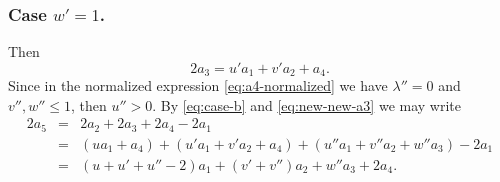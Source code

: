 \documentclass[12pt]{amsart}
\begin{document}
\subsubsection{Case \underline{$w'=1$}.} 
  Then
   \begin{equation}
			\label{eq:new-new-a3}
			2a_3=u' a_1+ v' a_2+a_4.
	 \end{equation}
  Since  in the normalized expression \eqref{eq:a4-normalized} we have $\lambda''=0$ and $v'',w'' \leq 1$, then $u'' >0$.
	 	\noindent By \eqref{eq:case-b} and \eqref{eq:new-new-a3} we may write
			\begin{eqnarray*}
				2 a_5 &=& 2a_2+ 2a_3+2a_4-2a_1 \\
				      &=& (u a_1+a_4) + (u'a_1+v' a_2 +a_4) + (u''a_1+v''a_2+w'' a_3)-2a_1 \\
							&=& (u+u'+u''-2) a_1+ (v'+v'')a_2 +w'' a_3 +2a_4.
			\end{eqnarray*}
\end{document}
